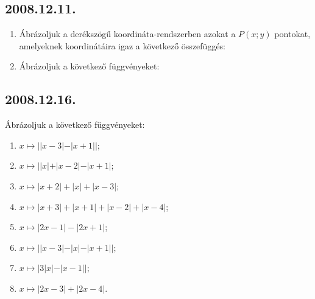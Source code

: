 \subsection*{2008.12.11.}
\begin{enumerate}
\item Ábrázoljuk a derékszögű koordináta-rendszerben azokat a 
$P(x;y)$ pontokat, amelyeknek koordinátáira igaz a következő összefüggés:
\item Ábrázoljuk a következő függvényeket:

\end{enumerate}

\subsection*{2008.12.16.}
Ábrázoljuk a következő függvényeket:
\begin{enumerate}
\item $x\mapsto ||x-3|-|x+1||$;
\item $x\mapsto ||x|+|x-2|-|x+1|$;
\item $x\mapsto |x+2|+|x|+|x-3|$;
\item $x\mapsto |x+3|+|x+1|+|x-2|+|x-4|$;
\item $x\mapsto |2x-1|-|2x+1|$;
\item $x\mapsto ||x-3|-|x|-|x+1||$;
\item $x\mapsto |3|x|-|x-1||$;
\item $x\mapsto |2x-3|+|2x-4|$.
\end{enumerate}

